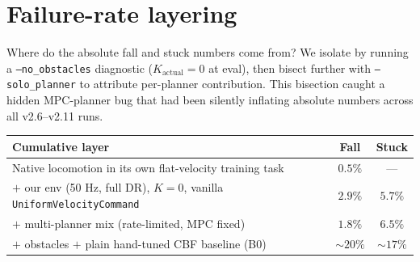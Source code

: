 \documentclass[11pt]{article}
\begin{document}
\section{Failure-rate layering}

Where do the absolute fall and stuck numbers come from? We isolate by running
a \texttt{--no\_obstacles} diagnostic ($K_{\text{actual}}=0$ at eval), then
bisect further with \texttt{--solo\_planner} to attribute per-planner
contribution. This bisection caught a hidden MPC-planner bug that had been
silently inflating absolute numbers across all v2.6--v2.11 runs.

\begin{small}
\begin{tabularx}{\linewidth}{@{}Xcc@{}}
\toprule
Cumulative layer                                                                   & Fall        & Stuck       \\
\midrule
Native locomotion in its own flat-velocity training task                           & $0.5\%$     & ---         \\
$+$ our env (50 Hz, full DR), $K{=}0$, vanilla \texttt{UniformVelocityCommand}     & $2.9\%$     & $5.7\%$     \\
$+$ multi-planner mix (rate-limited, MPC fixed)                                    & $1.8\%$     & $6.5\%$     \\
$+$ obstacles $+$ plain hand-tuned CBF baseline (B0)                               & $\sim 20\%$ & $\sim 17\%$ \\
\bottomrule
\end{tabularx}
\end{small}
\end{document}
